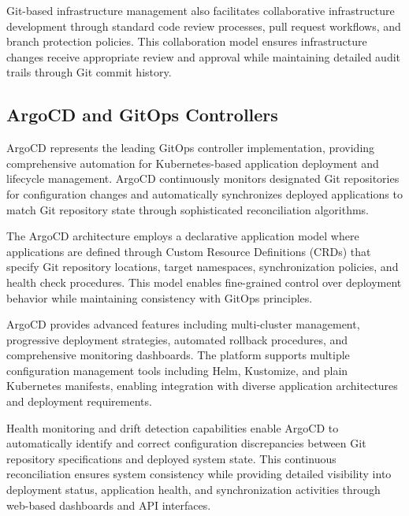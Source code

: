 Git-based infrastructure management also facilitates collaborative infrastructure development through standard code review processes, pull request workflows, and branch protection policies. This collaboration model ensures infrastructure changes receive appropriate review and approval while maintaining detailed audit trails through Git commit history.

\subsection{ArgoCD and GitOps Controllers}

ArgoCD represents the leading GitOps controller implementation, providing comprehensive automation for Kubernetes-based application deployment and lifecycle management. ArgoCD continuously monitors designated Git repositories for configuration changes and automatically synchronizes deployed applications to match Git repository state through sophisticated reconciliation algorithms.

The ArgoCD architecture employs a declarative application model where applications are defined through Custom Resource Definitions (CRDs) that specify Git repository locations, target namespaces, synchronization policies, and health check procedures. This model enables fine-grained control over deployment behavior while maintaining consistency with GitOps principles.

ArgoCD provides advanced features including multi-cluster management, progressive deployment strategies, automated rollback procedures, and comprehensive monitoring dashboards. The platform supports multiple configuration management tools including Helm, Kustomize, and plain Kubernetes manifests, enabling integration with diverse application architectures and deployment requirements.

Health monitoring and drift detection capabilities enable ArgoCD to automatically identify and correct configuration discrepancies between Git repository specifications and deployed system state. This continuous reconciliation ensures system consistency while providing detailed visibility into deployment status, application health, and synchronization activities through web-based dashboards and API interfaces.